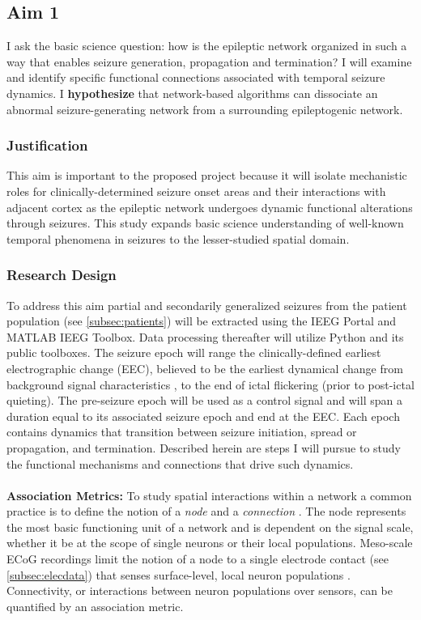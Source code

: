 \subsection{Aim 1}
\label{rsappr:aim1}
I ask the basic science question: how is the epileptic network organized in such a way that enables seizure generation, propagation and termination? I will examine and identify specific functional connections associated with temporal seizure dynamics. I \textbf{hypothesize} that network-based algorithms can dissociate an abnormal seizure-generating network from a surrounding epileptogenic network.

\subsubsection{Justification}
This aim is important to the proposed project because it will isolate mechanistic roles for clinically-determined seizure onset areas and their interactions with adjacent cortex as the epileptic network undergoes dynamic functional alterations through seizures. This study expands basic science understanding of well-known temporal phenomena in seizures to the lesser-studied spatial domain.

\subsubsection{Research Design}
To address this aim partial and secondarily generalized seizures from the patient population (see \ref{subsec:patients}) will be extracted using the IEEG Portal and MATLAB IEEG Toolbox. Data processing thereafter will utilize Python and its public toolboxes.  The seizure epoch will range the clinically-defined earliest electrographic change (EEC), believed to be the earliest dynamical change from background signal characteristics \cite{litt2001epileptic}, to the end of ictal flickering (prior to post-ictal quieting). The pre-seizure epoch will be used as a control signal and will span a duration equal to its associated seizure epoch and end at the EEC. Each epoch contains dynamics that transition between seizure initiation, spread or propagation, and termination. Described herein are steps I will pursue to study the functional mechanisms and connections that drive such dynamics.
~\\
~\\
\textbf{Association Metrics:}
To study spatial interactions within a network a common practice is to define the notion of a \textit{node} and a \textit{connection} \cite{bullmore2011brain}. The node represents the most basic functioning unit of a network and is dependent on the signal scale, whether it be at the scope of single neurons or their local populations. Meso-scale ECoG recordings limit the notion of a node to a single electrode contact (see \ref{subsec:elecdata}) that senses surface-level, local neuron populations \cite{buzsaki2012origin}. Connectivity, or interactions between neuron populations over sensors, can be quantified by an association metric.

